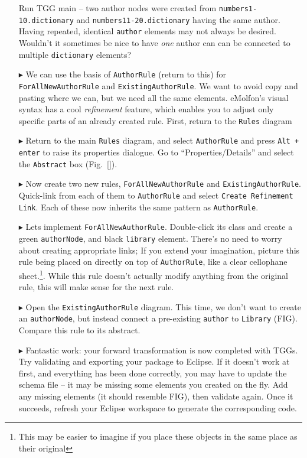 \begin{itemize}
Run TGG main -- two author nodes were created from
\texttt{numbers1-10.dictionary} and \texttt{numbers11-20.dictionary} having the same author. Having repeated, identical \texttt{author} elements may not always be desired. Wouldn't it sometimes be nice to have \emph{one} author can can be
connected to multiple \texttt{dictionary} elements?

\item[$\blacktriangleright$] We can use the basis of \texttt{AuthorRule} (return to this) for \texttt{ForAllNewAuthorRule} and \texttt{ExistingAuthorRule}. We
want to avoid copy and pasting where we can, but we need all the same elements. eMolfon's visual syntax has a cool \emph{refinement} feature, which enables you
to adjust only specific parts of an already created rule. First, return to the \texttt{Rules} diagram

\item[$\blacktriangleright$] Return to the main \texttt{Rules} diagram, and select \texttt{AuthorRule} and press \texttt{Alt + enter} to raise its properties
dialogue. Go to ``Properties/Details'' and select the \texttt{Abstract} box (Fig.~\ref{}).

\item[$\blacktriangleright$] Now create two new rules, \texttt{ForAllNewAuthorRule} and \texttt{ExistingAuthorRule}. Quick-link from each of them to
\texttt{AuthorRule} and select \texttt{Create Refinement Link}. Each of these now inherits the same pattern as \texttt{AuthorRule}.

\item[$\blacktriangleright$] Lets implement \texttt{ForAllNewAuthorRule}. Double-click its class and create a green \texttt{authorNode}, and black
\texttt{library} element. There's no need to worry about creating appropriate links; If you extend your imagination, picture this rule being placed on directly
on top of \texttt{AuthorRule}, like a clear cellophane sheet.\footnote{This may be easier to imagine if you place these objects in the same place as their
original}. While this rule doesn't actually modify anything from the original rule, this will make sense for the next rule.

\item[$\blacktriangleright$] Open the \texttt{ExistingAuthorRule} diagram. This time, we don't want to create an \texttt{authorNode}, but instead connect a
pre-existing \texttt{author} to \texttt{Library} (FIG). Compare this rule to its abstract.


\item[$\blacktriangleright$] Fantastic work: your forward transformation is now completed with TGGs. Try validating and exporting your package to Eclipse. If it
doesn't work at first, and everything has been done correctly, you may have to update the schema file -- it may be missing some elements you created on the fly.
Add any missing elements (it should resemble FIG), then validate again. Once it succeeds, refresh your Eclipse workspace to generate the corresponding code.



\end{itemize}
